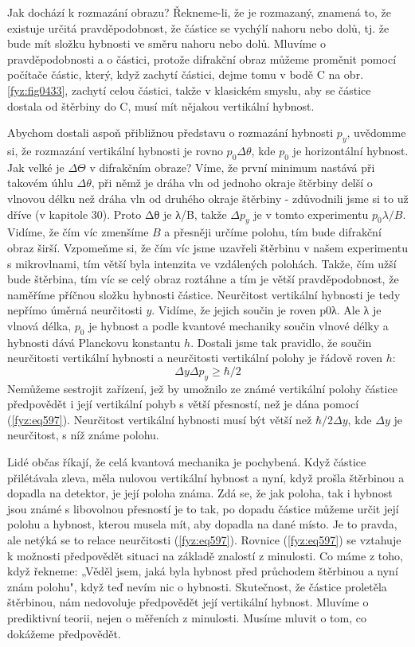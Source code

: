     Jak dochází k rozmazání obrazu? Řekneme-li, že je rozmazaný, znamená to, že existuje určitá
    pravděpodobnost, že částice se vychýlí nahoru nebo dolů, tj. že bude mít složku hybnosti ve
    směru nahoru nebo dolů. Mluvíme o pravděpodobnosti a o částici, protože difrakční obraz můžeme
    proměnit pomocí počítače částic, který, když zachytí částici, dejme tomu v bodě C na obr.
    \ref{fyz:fig0433}, zachytí celou částici, takže v klasickém smyslu, aby se částice dostala od
    štěrbiny do C, musí mít nějakou vertikální hybnost.

    Abychom dostali aspoň přibližnou představu o rozmazání hybnosti \(p_y\), uvědomme si, že
    rozmazání vertikální hybnosti je rovno \(p_0Δθ\), kde \(p_0\) je horizontální hybnost. Jak velké
    je \(\Delta \Theta\) v difrakčním obraze? Víme, že první minimum nastává při takovém úhlu
    \(Δθ\), při němž je dráha vln od jednoho okraje štěrbiny delší o vlnovou délku než dráha vln od
    druhého okraje štěrbiny - zdůvodnili jsme si to už dříve (v kapitole 30). Proto Δθ je λ/B, takže
    \(Δp_y\) je v tomto experimentu \(p_0λ/B\). Vidíme, že čím víc zmenšíme \(B\) a přesněji určíme
    polohu, tím bude difrakční obraz širší. Vzpomeňme si, že čím víc jsme uzavřeli štěrbinu v našem
    experimentu s mikrovlnami, tím větší byla intenzita ve vzdálených polohách. Takže, čím užší bude
    štěrbina, tím víc se celý obraz roztáhne a tím je větší pravděpodobnost, že naměříme příčnou
    složku hybnosti částice. Neurčitost vertikální hybnosti je tedy nepřímo úměrná neurčitosti
    \(y\). Vidíme, že jejich součin je roven p0λ. Ale λ je vlnová délka, \(p_0\) je hybnost a podle
    kvantové mechaniky součin vlnové délky a hybnosti dává Planckovu konstantu \(h\). Dostali jsme
    tak pravidlo, že součin neurčitosti vertikální hybnosti a neurčitosti vertikální polohy je
    řádově roven \(h\):
    \begin{equation}\label{fyz:eq597}
      \boxed{ΔyΔp_y ≥ \hbar/2}
    \end{equation}
    Nemůžeme sestrojit zařízení, jež by umožnilo ze známé vertikální polohy částice předpovědět i
    její vertikální pohyb s větší přesností, než je dána pomocí (\ref{fyz:eq597}). Neurčitost
    vertikální hybnosti musí být větší než \(\hbar/2Δy\), kde \(Δy\) je neurčitost, s níž známe
    polohu.

    Lidé občas říkají, že celá kvantová mechanika je pochybená. Když částice přilétávala zleva, měla
    nulovou vertikální hybnost a nyní, když prošla štěrbinou a dopadla na detektor, je její poloha
    známa. Zdá se, že jak poloha, tak i hybnost jsou známé s libovolnou přesností je to tak, po
    dopadu částice můžeme určit její polohu a hybnost, kterou musela mít, aby dopadla na dané místo.
    Je to pravda, ale netýká se to relace neurčitosti (\ref{fyz:eq597}). Rovnice (\ref{fyz:eq597})
    se vztahuje k možnosti předpovědět situaci na základě znalostí z minulosti. Co máme z toho, když
    řekneme: „Věděl jsem, jaká byla hybnost před průchodem štěrbinou a nyní znám polohu", když teď
    nevím nic o hybnosti. Skutečnost, že částice proletěla štěrbinou, nám nedovoluje předpovědět
    její vertikální hybnost. Mluvíme o prediktivní teorii, nejen o měřeních z minulosti. Musíme
    mluvit o tom, co dokážeme předpovědět.

